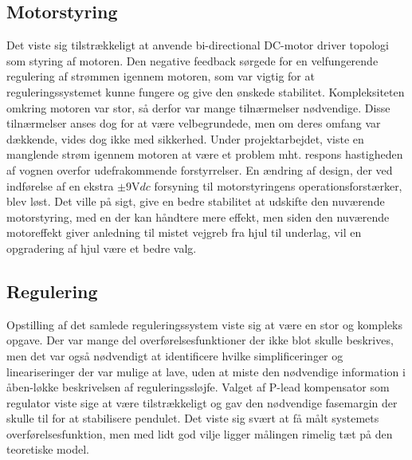 \subsection{Motorstyring}
Det viste sig tilstrækkeligt at anvende bi-directional DC-motor driver topologi som styring af motoren. 
Den negative feedback sørgede for en velfungerende regulering af strømmen igennem motoren, som var vigtig for at reguleringssystemet kunne fungere og give den ønskede stabilitet.
Kompleksiteten omkring motoren var stor, så derfor var mange tilnærmelser nødvendige.
Disse tilnærmelser anses dog for at være velbegrundede, men om deres omfang var dækkende, vides dog ikke med sikkerhed.
Under projektarbejdet, viste en manglende strøm igennem motoren at være et problem mht. respons hastigheden af vognen overfor udefrakommende forstyrrelser.     
En ændring af design, der ved indførelse af en ekstra $\pm 9 \si{\volt}dc$ forsyning til motorstyringens operationsforstærker, blev løst.
Det ville på sigt, give en bedre stabilitet at udskifte den nuværende motorstyring, med en der kan håndtere mere effekt, men siden den nuværende motoreffekt giver anledning til mistet vejgreb fra hjul til underlag, vil en opgradering af hjul være et bedre valg. 

\subsection{Regulering}
Opstilling af det samlede reguleringssystem viste sig at være en stor og kompleks opgave.
Der var mange del overførelsesfunktioner der ikke blot skulle beskrives, men det var også nødvendigt at identificere hvilke simplificeringer og lineariseringer der var mulige at lave, uden at miste den nødvendige information i åben-løkke beskrivelsen af reguleringssløjfe.
Valget af P-lead kompensator som regulator viste sige at være tilstrækkeligt og gav den nødvendige fasemargin der skulle til for at stabilisere pendulet.
Det viste sig svært at få målt systemets overførelsesfunktion, men med lidt god vilje ligger målingen rimelig tæt på den teoretiske model. 



